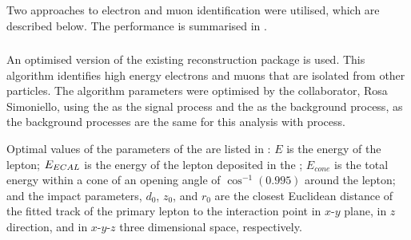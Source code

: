 Two approaches to electron and muon identification were utilised, which are described below. The performance is summarised in .



\subsubsection{\IsolatedLeptonFinderProcessor}
\label{sec:doubleHiggsIsolatedLeptonFinder}
An optimised version of the existing  \IsolatedLeptonFinderProcessor reconstruction package is used. This algorithm identifies high energy electrons and muons that are isolated from other particles. The algorithm parameters were optimised by the \CLIC collaborator, Rosa Simoniello,   using the \eeToHHbbbb as the signal process and the \eeTo{ \Pquark \Pquark \Pquark \Pquark \Plepton \Pnu} as the background process, as the background processes are the same for this analysis with \eeToHHbbWW process.



Optimal values of the parameters of the \IsolatedLeptonFinderProcessor are listed in : $E$ is the energy of the lepton; $E_{ECAL}$ is the energy of the lepton deposited in the \ECAL; $E_{cone}$ is the total energy within a cone of an opening angle of $\cos^{-1}(0.995)$ around the lepton; and the impact parameters, $d_0$, $z_0$, and $r_0$ are the closest Euclidean distance of the fitted track of the primary lepton to the interaction point  in $x$-$y$ plane, in $z$ direction, and in $x$-$y$-$z$ three dimensional space, respectively.



